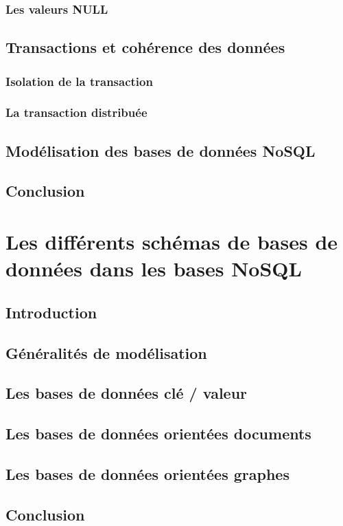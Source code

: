 \documentclass[12pt,titlepage,a4paper]{report}
\begin{document}
			\subsection{Les valeurs NULL}

		\section{Transactions et cohérence des données}
			\subsection{Isolation de la transaction}
			\subsection{La transaction distribuée}

		\section{Modélisation des bases de données NoSQL}
			

		\section*{Conclusion}
			

	\chapter{Les différents schémas de bases de données dans les bases NoSQL}
	\minitoc

		\section*{Introduction}
			

		\section{Généralités de modélisation}
			

		\section{Les bases de données clé / valeur}
			

		\section{Les bases de données orientées documents}
		\label{sec:BDDDocuments}
		
		\section{Les bases de données orientées graphes}

		\section*{Conclusion}
			

	
	
\end{document}
